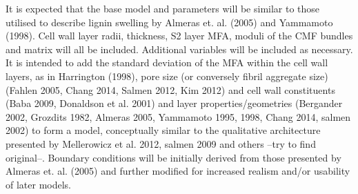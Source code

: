 It is expected that the base model and parameters will be similar to those
utilised to describe lignin swelling by Almeras  et. al. (2005) and Yammamoto
(1998). Cell wall layer radii, thickness, S2 layer MFA, moduli of the CMF
bundles and matrix will all be included. Additional variables will be included
as necessary. It is intended to add the standard deviation of the MFA within the
cell wall layers, as in Harrington (1998), pore size (or conversely fibril
aggregate size) (Fahlen 2005, Chang 2014, Salmen 2012, Kim 2012) and cell wall
constituents (Baba 2009, Donaldson et al. 2001) and layer properties/geometries
(Bergander 2002, Grozdits 1982, Almeras 2005, Yammamoto 1995, 1998, Chang 2014,
salmen 2002) to form a model, conceptually similar to the qualitative
architecture presented by Mellerowicz et al. 2012, salmen 2009 and others --try
to find original--. Boundary conditions will be initially derived from those
presented by Almeras et. al. (2005) and further modified for increased realism
and/or usability of later models.